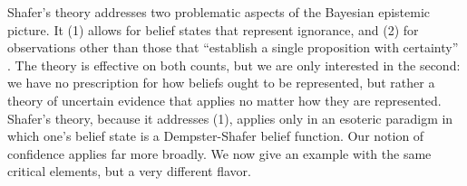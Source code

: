 Shafer's theory addresses two problematic aspects of the Bayesian
epistemic picture. It (1) allows for belief states that represent ignorance,
and (2) for observations other than those that 
``establish a single proposition with certainty''
\parencite[Chapter 1: \S7,\S8]{shafer1976mathematical}.
The theory is effective on both counts, but we are only interested in the second:
we have no prescription for how beliefs ought to be represented, but rather
a theory of uncertain evidence that applies no matter how they are represented.
%
Shafer's theory, because it addresses (1), applies only in an
esoteric paradigm in which 
one's belief state is a Dempster-Shafer belief function. 
%
Our notion of confidence
applies far more broadly.
We now give an example with the same critical elements,
but a very different flavor.

